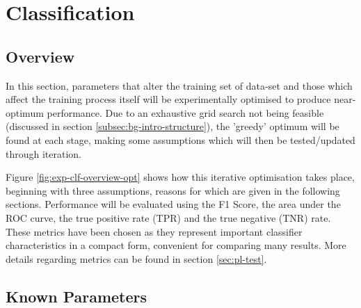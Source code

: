 \section{Classification}
\label{sec:exp-clf}
    \subsection{Overview}
    \label{subsec:exp-clf-overview}
        In this section, parameters that alter the training set of data-set and those which affect the training process itself will be experimentally optimised to produce near-optimum performance. Due to an exhaustive grid search not being feasible (discussed in section \ref{subsec:bg-intro-structure}), the 'greedy' optimum will be found at each stage, making some assumptions which will then be tested/updated through iteration.
        
        
        
        Figure \ref{fig:exp-clf-overview-opt} shows how this iterative optimisation takes place, beginning with three assumptions, reasons for which are given in the following sections. Performance will be evaluated using the F1 Score, the area under the ROC curve, the true positive rate (TPR) and the true negative (TNR) rate. These metrics have been chosen as they represent important classifier characteristics in a compact form, convenient for comparing many results. More details regarding metrics can be found in section \ref{sec:pl-test}.
        
    \subsection{Known Parameters}
    \label{subsec:exp-clf-known}
